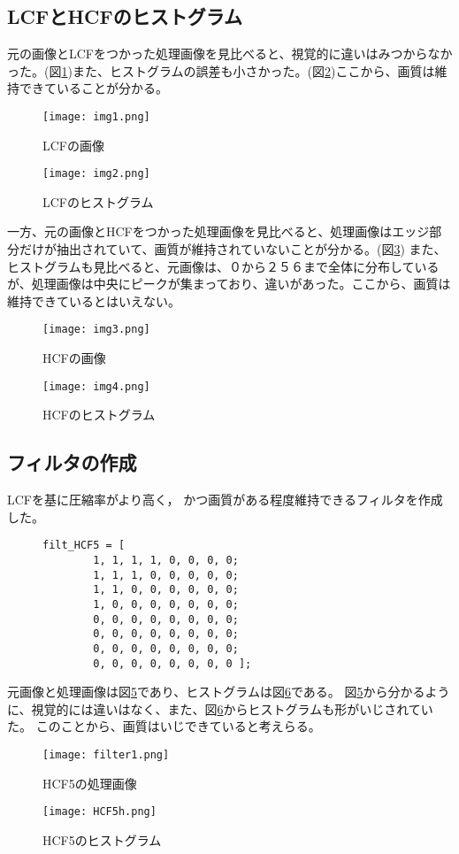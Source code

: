 \documentclass[a4j]{jsarticle}
\begin{document}
\subsection{LCFとHCFのヒストグラム}
元の画像とLCFをつかった処理画像を見比べると、視覚的に違いはみつからなかった。(図\ref{pic:img1})また、ヒストグラムの誤差も小さかった。(図\ref{pic:img2})ここから、画質は維持できていることが分かる。\\
\begin{figure}
  \centering
  \texttt{[image: img1.png]}
  \caption{LCFの画像}
  \label{pic:img1}
\end{figure}
\begin{figure}
  \centering
  \texttt{[image: img2.png]}
  \caption{LCFのヒストグラム}
  \label{pic:img2}
\end{figure}
一方、元の画像とHCFをつかった処理画像を見比べると、処理画像はエッジ部分だけが抽出されていて、画質が維持されていないことが分かる。(図\ref{pic:img3})
また、ヒストグラムも見比べると、元画像は、０から２５６まで全体に分布しているが、処理画像は中央にピークが集まっており、違いがあった。ここから、画質は維持できているとはいえない。
\begin{figure}
  \centering
  \texttt{[image: img3.png]}
  \caption{HCFの画像}
  \label{pic:img3}
\end{figure}
\begin{figure}
  \centering
  \texttt{[image: img4.png]}
  \caption{HCFのヒストグラム}
  \label{pic:img4}
\end{figure}
\subsection{フィルタの作成}
LCFを基に圧縮率がより高く，
かつ画質がある程度維持できるフィルタを作成した。

\begin{figure}
  \begin{verbatim}
filt_HCF5 = [
        1, 1, 1, 1, 0, 0, 0, 0;
        1, 1, 1, 0, 0, 0, 0, 0;
        1, 1, 0, 0, 0, 0, 0, 0;
        1, 0, 0, 0, 0, 0, 0, 0;
        0, 0, 0, 0, 0, 0, 0, 0;
        0, 0, 0, 0, 0, 0, 0, 0;
        0, 0, 0, 0, 0, 0, 0, 0;
        0, 0, 0, 0, 0, 0, 0, 0 ];
  \end{verbatim}
\end{figure}
元画像と処理画像は図\ref{pic:HCF5}であり、ヒストグラムは図\ref{pic:HCF5h}である。
図\ref{pic:HCF5}から分かるように、視覚的には違いはなく、また、図\ref{pic:HCF5h}からヒストグラムも形がいじされていた。
このことから、画質はいじできていると考えらる。
\begin{figure}[H]
  \centering
  \texttt{[image: filter1.png]}
  \caption{HCF5の処理画像}
  \label{pic:HCF5}
\end{figure}
\begin{figure}[H]
  \centering
  \texttt{[image: HCF5h.png]}
  \caption{HCF5のヒストグラム}
  \label{pic:HCF5h}
\end{figure}
\end{document}
